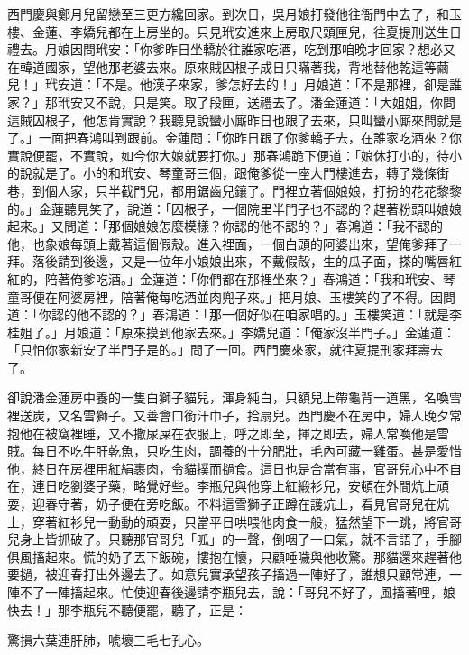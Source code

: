 \begin{showcontents}{}
西門慶與鄭月兒留戀至三更方纔回家。到次日，吳月娘打發他往衙門中去了，和玉樓、金蓮、李嬌兒都在上房坐的。只見玳安進來上房取尺頭匣兒，往夏提刑送生日禮去。月娘因問玳安：「你爹昨日坐轎於往誰家吃酒，吃到那咱晚才回家？想必又在韓道國家，望他那老婆去來。原來賊囚根子成日只瞞著我，背地替他乾這等繭兒！」玳安道：「不是。他漢子來家，爹怎好去的！」月娘道：「不是那裡，卻是誰家？」那玳安又不說，只是笑。取了段匣，送禮去了。潘金蓮道：「大姐姐，你問這賊囚根子，他怎肯實說？我聽見說蠻小廝昨日也跟了去來，只叫蠻小廝來問就是了。」一面把春鴻叫到跟前。金蓮問：「你昨日跟了你爹轎子去，在誰家吃酒來？你實說便罷，不實說，如今你大娘就要打你。」那春鴻跪下便道：「娘休打小的，待小的說就是了。小的和玳安、琴童哥三個，跟俺爹從一座大門樓進去，轉了幾條街巷，到個人家，只半截門兒，都用鋸齒兒鑲了。門裡立著個娘娘，打扮的花花黎黎的。」金蓮聽見笑了，說道：「囚根子，一個院里半門子也不認的？趕著粉頭叫娘娘起來。」又問道：「那個娘娘怎麼模樣？你認的他不認的？」春鴻道：「我不認的他，也象娘每頭上戴著這個假殼。進入裡面，一個白頭的阿婆出來，望俺爹拜了一拜。落後請到後邊，又是一位年小娘娘出來，不戴假殼，生的瓜子面，搽的嘴唇紅紅的，陪著俺爹吃酒。」金蓮道：「你們都在那裡坐來？」春鴻道：「我和玳安、琴童哥便在阿婆房裡，陪著俺每吃酒並肉兜子來。」把月娘、玉樓笑的了不得。因問道：「你認的他不認的？」春鴻道：「那一個好似在咱家唱的。」玉樓笑道：「就是李桂姐了。」月娘道：「原來摸到他家去來。」李嬌兒道：「俺家沒半門子。」金蓮道：「只怕你家新安了半門子是的。」問了一回。西門慶來家，就往夏提刑家拜壽去了。

卻說潘金蓮房中養的一隻白獅子貓兒，渾身純白，只額兒上帶龜背一道黑，名喚雪裡送炭，又名雪獅子。又善會口銜汗巾子，拾扇兒。西門慶不在房中，婦人晚夕常抱他在被窩裡睡，又不撒尿屎在衣服上，呼之即至，揮之即去，婦人常喚他是雪賊。每日不吃牛肝乾魚，只吃生肉，調養的十分肥壯，毛內可藏一雞蛋。甚是愛惜他，終日在房裡用紅絹裹肉，令貓撲而撾食。這日也是合當有事，官哥兒心中不自在，連日吃劉婆子藥，略覺好些。李瓶兒與他穿上紅緞衫兒，安頓在外間炕上頑耍，迎春守著，奶子便在旁吃飯。不料這雪獅子正蹲在護炕上，看見官哥兒在炕上，穿著紅衫兒一動動的頑耍，只當平日哄喂他肉食一般，猛然望下一跳，將官哥兒身上皆抓破了。只聽那官哥兒「呱」的一聲，倒咽了一口氣，就不言語了，手腳俱風搐起來。慌的奶子丟下飯碗，摟抱在懷，只顧唾噦與他收驚。那貓還來趕著他要撾，被迎春打出外邊去了。如意兒實承望孩子搐過一陣好了，誰想只顧常連，一陣不了一陣搐起來。忙使迎春後邊請李瓶兒去，說：「哥兒不好了，風搐著哩，娘快去！」那李瓶兒不聽便罷，聽了，正是：

驚損六葉連肝肺，唬壞三毛七孔心。


\end{showcontents}
